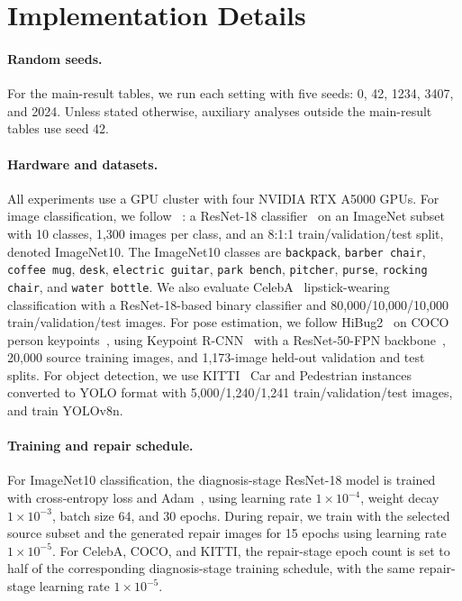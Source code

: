 \section{Implementation Details}
\label{app:implementation-details}

\paragraph{Random seeds.}
For the main-result tables, we run each setting with five seeds: 0, 42, 1234, 3407, and 2024. Unless stated otherwise, auxiliary analyses outside the main-result tables use seed 42.

\paragraph{Hardware and datasets.}
All experiments use a GPU cluster with four NVIDIA RTX A5000 GPUs. For image classification, we follow \safefix~\citep{xu2025safefix}: a ResNet-18 classifier~\citep{he2016deep} on an ImageNet subset~\citep{deng2009imagenet} with 10 classes, 1,300 images per class, and an 8:1:1 train/validation/test split, denoted ImageNet10. The ImageNet10 classes are \texttt{backpack}, \texttt{barber chair}, \texttt{coffee mug}, \texttt{desk}, \texttt{electric guitar}, \texttt{park bench}, \texttt{pitcher}, \texttt{purse}, \texttt{rocking chair}, and \texttt{water bottle}. We also evaluate CelebA~\citep{liu2015deep} lipstick-wearing classification with a ResNet-18-based binary classifier and 80,000/10,000/10,000 train/validation/test images. For pose estimation, we follow HiBug2~\citep{chen2025hibug2} on COCO person keypoints~\citep{lin2014microsoft}, using Keypoint R-CNN~\citep{mask-rcnn-2017} with a ResNet-50-FPN backbone~\citep{he2016deep}, 20,000 source training images, and 1,173-image held-out validation and test splits. For object detection, we use KITTI~\citep{geiger2012we} Car and Pedestrian instances converted to YOLO format with 5,000/1,240/1,241 train/validation/test images, and train YOLOv8n.

\paragraph{Training and repair schedule.}
For ImageNet10 classification, the diagnosis-stage ResNet-18 model is trained with cross-entropy loss and Adam~\citep{kingma2015adam}, using learning rate $1\times10^{-4}$, weight decay $1\times10^{-3}$, batch size 64, and 30 epochs. During repair, we train with the selected source subset and the generated repair images for 15 epochs using learning rate $1\times10^{-5}$. For CelebA, COCO, and KITTI, the repair-stage epoch count is set to half of the corresponding diagnosis-stage training schedule, with the same repair-stage learning rate $1\times10^{-5}$.

